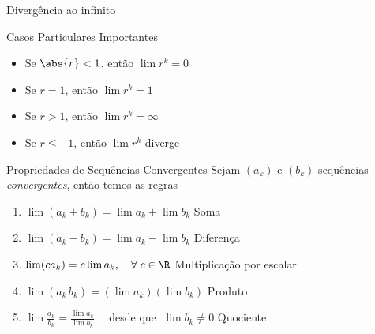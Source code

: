 \begin{frame}{Divergência ao infinito}
  \centering
  \scalebox{0.9}{}
\end{frame}

\begin{frame}{Casos Particulares Importantes}
  \begin{itemize}[<+->]
    \setlength\itemsep{1.5em}
    \item Se $\abs{r}<1$, \tabto{25mm} então \(\lim r^k=0\)
    \item Se $r = 1$,     \tabto{25mm} então \(\lim r^k=1\)
    \item Se $r > 1$,     \tabto{25mm} então \(\lim r^k=\infty\)
    \item Se $r \leq -1$, \tabto{25mm} então \(\lim r^k\) diverge
  \end{itemize}
\end{frame}

\begin{frame}{Propriedades de Sequências Convergentes}
    Sejam $(a_k)$ e $(b_k)$ sequências \emph{convergentes}, então temos as regras \\[4mm]
    \pause
    \begin{enumerate}[<+->]
        \item $\lim (a_k+b_k) = \lim a_k + \lim b_k$                                                 \tabto{77mm} Soma                      \\[5mm]
        \item $\lim (a_k-b_k) = \lim a_k - \lim b_k$                                                 \tabto{77mm} Diferença                 \\[5mm]
        \item $\lim (c a_k)   = c\lim a_k,\quad \forall\; c\in\R$                                    \tabto{77mm} Multiplicação por escalar \\[5mm]
        \item $\lim (a_k\,b_k)= (\lim a_k)(\lim b_k)$                                                \tabto{77mm} Produto                   \\[5mm]
        \item \(\lim \frac{a_k}{b_k} = \frac{\lim a_k}{\lim b_k}\quad\) desde que $\;\lim b_k \neq 0$  \tabto{77mm} Quociente
    \end{enumerate}
\end{frame}

